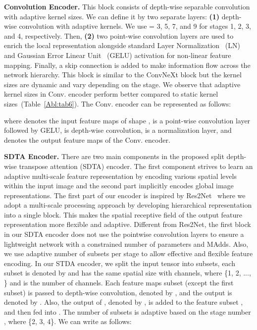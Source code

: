 \documentclass[runningheads]{llncs}
\begin{document}
\noindent \textbf{Convolution Encoder.} This block consists of depth-wise separable convolution with adaptive kernel sizes. We can define it by two separate layers: \textbf{(1)} depth-wise convolution with adaptive  kernels. We use  = 3, 5, 7, and 9 for stages 1, 2, 3, and 4, respectively. Then, \textbf{(2)} two point-wise convolution layers are used to enrich the local representation alongside standard Layer Normalization~\cite{LN} (LN) and Gaussian Error Linear Unit~\cite{GELU} (GELU) activation for non-linear feature mapping. Finally, a skip connection is added to make information flow across the network hierarchy. This block is similar to the ConvNeXt block but the kernel sizes are dynamic and vary depending on the stage. We observe that adaptive kernel sizes in Conv. encoder perform better compared to static kernel sizes~(Table~\ref{Abl:tab6}). The Conv. encoder can be represented as follows:

where  denotes the input feature maps of shape ,  is a point-wise convolution layer followed by GELU,  is  depth-wise convolution,  is a normalization layer, and  denotes the output feature maps of the Conv. encoder.

\noindent \textbf{SDTA Encoder.} There are two main components in the proposed split depth-wise transpose attention (SDTA)  encoder. The first component strives to learn an adaptive multi-scale feature representation by encoding various spatial levels within the input image and the second part implicitly encodes global image representations. The first part of our encoder is inspired by Res2Net~\cite{res2net} where we adopt a multi-scale processing approach by developing hierarchical representation into a single block. This makes the spatial receptive field of the output feature representation more flexible and adaptive. Different from Res2Net, the first block in our SDTA encoder does not use the  pointwise convolution layers to ensure a lightweight network with a constrained number of parameters and MAdds.
Also, we use adaptive number of subsets per stage to allow effective and flexible feature encoding. In our STDA encoder, we split the input tensor  into  subsets, each subset is denoted by  and has the same spatial size with  channels, where   \{1, 2, ..., \} and  is the number of channels. Each feature maps subset (except the first subset) is passed to  depth-wise convolution, denoted by , and the output is denoted by . Also, the output of , denoted by , is added to the feature subset , and then fed into . The number of subsets  is adaptive based on the stage number , where   \{2, 3, 4\}. We can write  as follows: 
\end{document}
